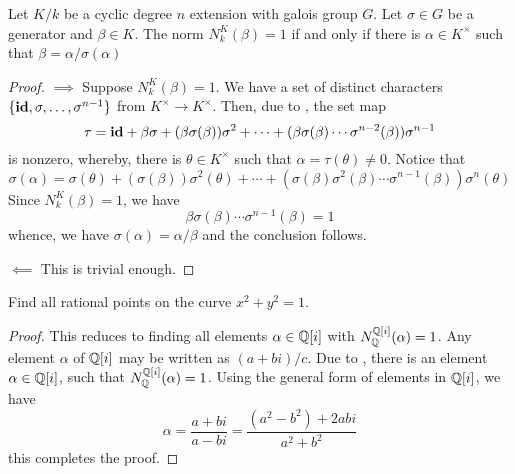 \begin{theorem}
    Let $K/k$ be a cyclic degree $n$ extension with galois group $G$. Let $\sigma\in G$ be a generator and $\beta\in K$. The norm $N^K_k(\beta) = 1$ if and only if there is $\alpha\in K^\times$ such that $\beta = \alpha/\sigma(\alpha)$
\end{theorem}
\begin{proof}
    $\implies$ Suppose $N^K_k(\beta) = 1$. We have a set of distinct characters $\{\mathbf{id},\sigma,\ldots,\sigma^{n - 1}\}$ from $K^\times\to K^\times$. Then, due to , the set map 
    \begin{equation*}
        \tau = \mathbf{id} + \beta\sigma + (\beta\sigma(\beta))\sigma^2 + \cdots + (\beta\sigma(\beta)\cdots\sigma^{n - 2}(\beta))\sigma^{n - 1}
    \end{equation*}
    is nonzero, whereby, there is $\theta\in K^\times$ such that $\alpha = \tau(\theta)\ne 0$. Notice that 
    \begin{equation*}
        \sigma(\alpha) = \sigma(\theta) + (\sigma(\beta))\sigma^2(\theta) + \cdots + (\sigma(\beta)\sigma^2(\beta)\cdots\sigma^{n - 1}(\beta))\sigma^n(\theta)
    \end{equation*}
    Since $N^K_k(\beta) = 1$, we have 
    \begin{equation*}
        \beta\sigma(\beta)\cdots\sigma^{n - 1}(\beta) = 1
    \end{equation*}
    whence, we have $\sigma(\alpha) = \alpha/\beta$ and the conclusion follows.

    $\impliedby$ This is trivial enough.
\end{proof}

\begin{example}
    Find all rational points on the curve $x^2 + y^2 = 1$.
\end{example}
\begin{proof}
    This reduces to finding all elements $\alpha\in\mathbb{Q}[i]$ with $N^{\mathbb{Q}[i]}_{\mathbb{Q}}(\alpha) = 1$. Any element $\alpha$ of $\mathbb{Q}[i]$ may be written as $(a + bi)/c$. Due to , there is an element $\alpha\in\mathbb{Q}[i]$, such that $N^{\mathbb{Q}[i]}_{\mathbb{Q}}(\alpha) = 1$. Using the general form of elements in $\mathbb{Q}[i]$, we have 
    \begin{equation*}
        \alpha = \frac{a + bi}{a - bi} = \frac{(a^2 - b^2) + 2abi}{a^2 + b^2}
    \end{equation*}
    this completes the proof.
\end{proof}

